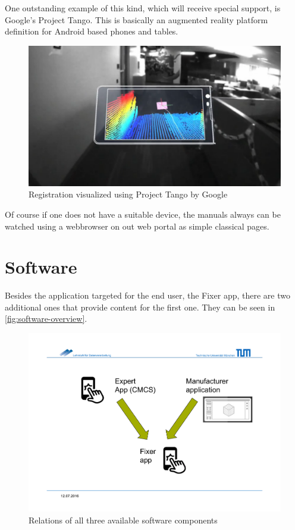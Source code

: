 		One outstanding example of this kind, which will receive special support, is Google's Project Tango. This is basically an augmented reality platform definition for Android based phones and tables.
		
		\begin{figure}[H]
			\centering
			\includegraphics[width=0.7\linewidth]{../images/project-tango}
			\caption{Registration visualized using Project Tango by Google}
			\label{fig:project-tango}
		\end{figure}
		
		Of course if one does not have a suitable device, the manuals always can be watched using a webbrowser on out web portal as simple classical pages.
		
	
	\section{Software}
		
		Besides the application targeted for the end user, the Fixer app, there are two additional ones that provide content for the first one. They can be seen in \autoref{fig:software-overview}.
		
		\begin{figure}[H]
			\includegraphics[width=\textwidth, trim=4cm 3cm 3cm 4cm, clip]{../images/software-overview.pdf}
			\centering
			\caption{Relations of all three available software components}
			\label{fig:software-overview}
		\end{figure}
		
